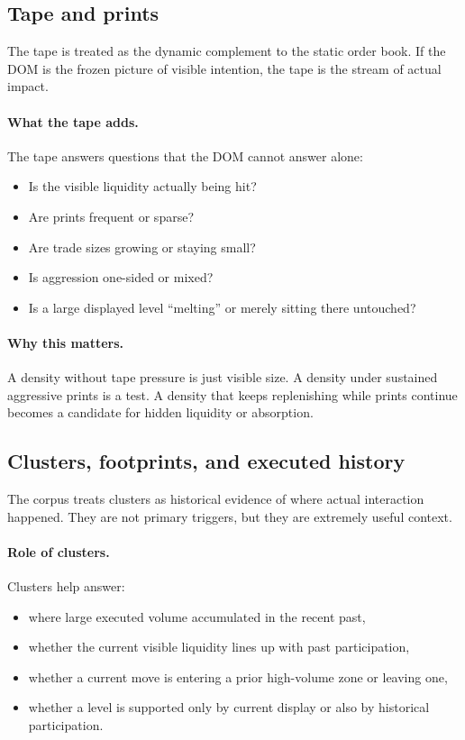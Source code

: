\subsection{Tape and prints}

The tape is treated as the dynamic complement to the static order book. If the DOM is the frozen picture of visible intention, the tape is the stream of actual impact.

\paragraph{What the tape adds.} The tape answers questions that the DOM cannot answer alone:

\begin{itemize}
\item Is the visible liquidity actually being hit?
\item Are prints frequent or sparse?
\item Are trade sizes growing or staying small?
\item Is aggression one-sided or mixed?
\item Is a large displayed level ``melting'' or merely sitting there untouched?
\end{itemize}

\paragraph{Why this matters.} A density without tape pressure is just visible size. A density under sustained aggressive prints is a test. A density that keeps replenishing while prints continue becomes a candidate for hidden liquidity or absorption.

\subsection{Clusters, footprints, and executed history}

The corpus treats clusters as historical evidence of where actual interaction happened. They are not primary triggers, but they are extremely useful context.

\paragraph{Role of clusters.} Clusters help answer:

\begin{itemize}
\item where large executed volume accumulated in the recent past,
\item whether the current visible liquidity lines up with past participation,
\item whether a current move is entering a prior high-volume zone or leaving one,
\item whether a level is supported only by current display or also by historical participation.
\end{itemize}

